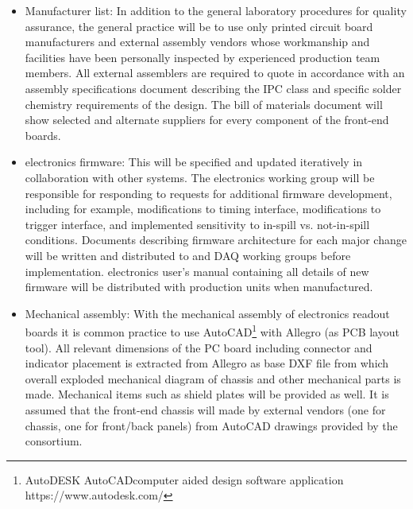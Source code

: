 \begin{itemize}
\item Manufacturer list: In addition to the general laboratory procedures for quality assurance, the general practice will be to use only printed circuit board manufacturers and external assembly vendors whose workmanship and facilities have been personally inspected by experienced production team members. All external assemblers are required to quote in accordance with an assembly specifications document describing the IPC class and specific solder chemistry requirements of the design. The bill of materials document will show selected and alternate suppliers for every component of the front-end boards.

\item {} electronics firmware: This will be specified and updated iteratively in collaboration with other systems. The electronics working group will be responsible for responding to requests for additional firmware development, including for example, modifications to timing interface, modifications to trigger interface, and implemented sensitivity to in-spill vs. not-in-spill conditions. Documents describing firmware architecture for each major change will be written and distributed to  and DAQ working groups before implementation.   electronics user's manual containing all details of new firmware will be distributed with production units when manufactured.

\item Mechanical assembly: With the mechanical assembly of electronics readout boards it is common practice to use AutoCAD\footnote{AutoDESK AutoCAD\textregistered computer aided design software application https://www.autodesk.com/} with Allegro (as PCB layout tool). All relevant dimensions of the PC board including connector and indicator placement is extracted from Allegro as base DXF file from which overall exploded mechanical diagram of chassis and other mechanical parts is made. Mechanical items such as shield plates will be provided as well. It is assumed that the front-end chassis will made by external vendors (one for chassis, one for front/back panels) from AutoCAD drawings provided by the consortium.

\end{itemize}
